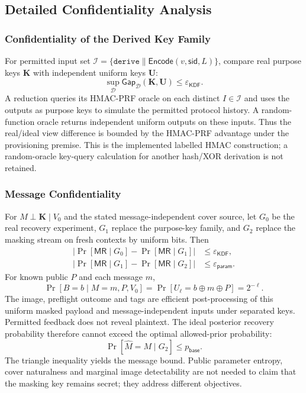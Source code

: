 \documentclass[journal]{IEEEtran}
\theoremstyle{definition}
\theoremstyle{game}
\begin{document}
\subsection{Detailed Confidentiality Analysis}
\subsubsection{Confidentiality of the Derived Key Family}
For permitted input set
$\mathcal I=\{\texttt{derive}\parallel\mathsf{Encode}(v,\mathsf{sid},L)\}$,
compare real purpose keys $\mathbf K$ with independent uniform keys $\mathbf U$:
\[
\sup_{\mathcal D}\mathsf{Gap}_{\mathcal D}(\mathbf K,\mathbf U)
\le\varepsilon_{\mathsf{KDF}}.
\]
A reduction queries its HMAC-PRF oracle on each distinct $I\in\mathcal I$
and uses the outputs as purpose keys to simulate the permitted protocol
history. A random-function oracle returns independent uniform outputs on
these inputs. Thus the real/ideal view difference is bounded by the HMAC-PRF
advantage under the provisioning premise. This is the implemented labelled
HMAC construction; a random-oracle key-query calculation for another
hash/XOR derivation is not retained.

\subsubsection{Message Confidentiality}
For $M\perp\mathbf K\mid V_0$ and the stated message-independent cover
source, let $G_0$ be the real recovery experiment, $G_1$ replace the purpose-key family,
and $G_2$ replace the masking stream on fresh contexts by uniform bits.
Then
\begin{align}
|\Pr[\mathsf{MR}\mid G_0]-\Pr[\mathsf{MR}\mid G_1]|
&\le\varepsilon_{\mathsf{KDF}},\\
|\Pr[\mathsf{MR}\mid G_1]-\Pr[\mathsf{MR}\mid G_2]|
&\le\varepsilon_{\mathsf{param}}.
\end{align}
For known public $P$ and each message $m$,
\[
\Pr[B=b\mid M=m,P,V_0]=
\Pr[U_\ell=b\oplus m\oplus P]=2^{-\ell}.
\]
The image, preflight outcome and tags are efficient post-processing of this
uniform masked payload and message-independent inputs under separated keys.
Permitted feedback does not reveal plaintext. The ideal posterior recovery
probability therefore cannot exceed the optimal allowed-prior probability:
\[
\Pr[\widehat M=M\mid G_2]\le p_{\mathsf{base}}.
\]
The triangle inequality yields the message bound. Public parameter entropy,
cover naturalness and marginal image detectability are not needed to claim
that the masking key remains secret; they address different objectives.
\end{document}
